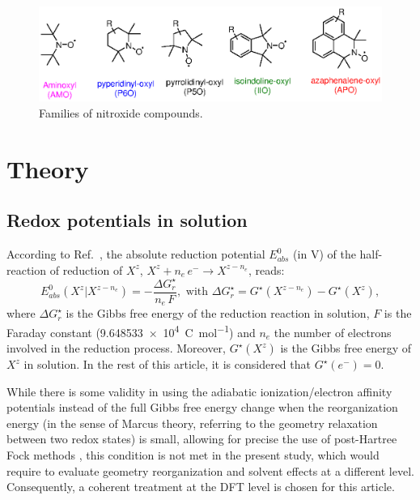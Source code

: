 \documentclass[review,preprint]{elsarticle}
\begin{document}
\begin{figure}[!h]
	\centering
	\includegraphics[width=\linewidth]{Figure2}
	\caption{Families of nitroxide compounds.}
	\label{fig:families}
\end{figure}

\section{Theory}\label{sec:theory}

\subsection{Redox potentials in solution}

According to Ref.~\cite{marenichComputationalElectrochemistryPrediction2014}, the absolute reduction potential $E_{abs}^0$ (in \si{\volt}) of the half-reaction of reduction of $X^z$, $X^{z} + n_e\,e^- \rightarrow X^{z-n_e}$, reads: \begin{equation}
	E_{abs}^0(X^{z}|X^{z-n_e}) = -\frac{\Delta G_{r}^\star}{n_e\,F}, \text{ with } \Delta G_{r}^\star = G^\star(X^{z-n_e}) - G^\star(X^z), \label{eq:nernst}
\end{equation}
where $\Delta G_{r}^\star$ is the Gibbs free energy of the reduction reaction in solution, $F$ is the Faraday constant (\SI{9.648533e4}{\coulomb\per\mole}) and $n_e$ the number of electrons involved in the reduction process. Moreover, $G^\star(X^z)$ is the Gibbs free energy of $X^z$ in solution.  In the rest of this article, it is considered that $G^\star(e^-) = 0$.

While there is some validity in using the adiabatic ionization/electron affinity potentials instead of the full Gibbs free energy change when the reorganization energy (in the sense of Marcus theory, referring to the geometry relaxation between two redox states) is small, allowing for precise the use of post-Hartree Fock methods  \cite{namazianBenchmarkCalculationsAbsolute2010,marenichComputationalElectrochemistryPrediction2014,makosModelingAbsoluteRedox2022}, this condition is not met in the present study, which would require to evaluate geometry reorganization and solvent effects at a different level. Consequently, a coherent treatment at the DFT level is chosen for this article.
\end{document}
